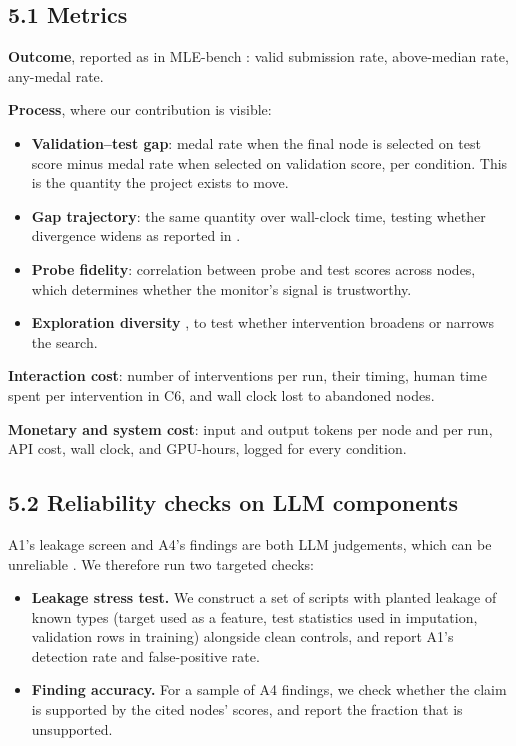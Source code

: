 \documentclass[11pt]{article}
\begin{document}
\subsection*{5.1 Metrics}

\textbf{Outcome}, reported as in MLE-bench \cite{mlebench}: valid submission rate,
above-median rate, any-medal rate.

\textbf{Process}, where our contribution is visible:
\begin{itemize}[leftmargin=*,itemsep=0.15em]
    \item \textbf{Validation--test gap}: medal rate when the final node is selected on
          test score minus medal rate when selected on validation score, per
          condition. This is the quantity the project exists to move.
    \item \textbf{Gap trajectory}: the same quantity over wall-clock time, testing
          whether divergence widens as reported in \cite{aira}.
    \item \textbf{Probe fidelity}: correlation between probe and test scores across
          nodes, which determines whether the monitor's signal is trustworthy.
    \item \textbf{Exploration diversity} \cite{fmlbench}, to test whether
          intervention broadens or narrows the search.
\end{itemize}

\textbf{Interaction cost}: number of interventions per run, their timing, human time
spent per intervention in C6, and wall clock lost to abandoned nodes.

\textbf{Monetary and system cost}: input and output tokens per node and per run, API
cost, wall clock, and GPU-hours, logged for every condition.

\subsection*{5.2 Reliability checks on LLM components}

A1's leakage screen and A4's findings are both LLM judgements, which can be
unreliable \cite{llmjudge}. We therefore run two targeted checks:
\begin{itemize}[leftmargin=*,itemsep=0.15em]
    \item \textbf{Leakage stress test.} We construct a set of scripts with planted
          leakage of known types (target used as a feature, test statistics used in
          imputation, validation rows in training) alongside clean controls, and
          report A1's detection rate and false-positive rate.
    \item \textbf{Finding accuracy.} For a sample of A4 findings, we check whether
          the claim is supported by the cited nodes' scores, and report the fraction
          that is unsupported.
\end{itemize}
\end{document}
